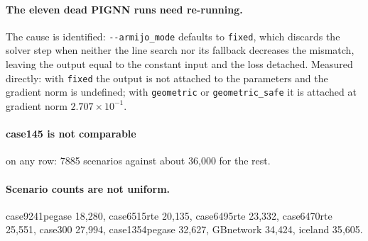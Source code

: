 \documentclass[10pt]{article}
\begin{document}
\paragraph{The eleven dead PIGNN runs need re-running.} The cause is identified:
\texttt{-{}-armijo\_mode} defaults to \texttt{fixed}, which discards the solver
step when neither the line search nor its fallback decreases the mismatch,
leaving the output equal to the constant input and the loss detached. Measured
directly: with \texttt{fixed} the output is not attached to the parameters and
the gradient norm is undefined; with \texttt{geometric} or
\texttt{geometric\_safe} it is attached at gradient norm $2.707\times10^{-1}$.

\paragraph{case145 is not comparable} on any row: 7885 scenarios against about
36{,}000 for the rest.

\paragraph{Scenario counts are not uniform.} case9241pegase 18{,}280,
case6515rte 20{,}135, case6495rte 23{,}332, case6470rte 25{,}551, case300
27{,}994, case1354pegase 32{,}627, GBnetwork 34{,}424, iceland 35{,}605.
\end{document}
